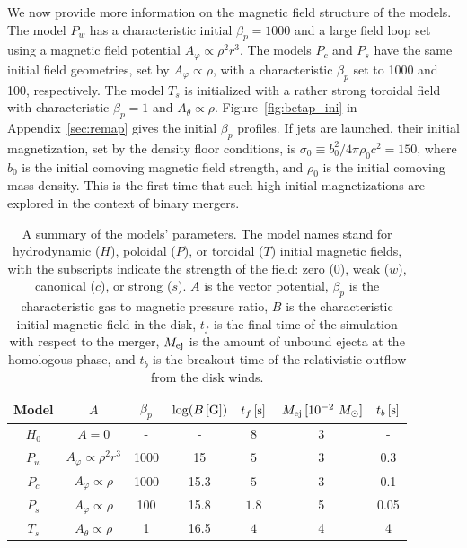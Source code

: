 \documentclass[twocolumn,dvipsnames]{aastex62}
\newcommand{\mej}{\,{M_{\rm ej}}}
\newcommand{\msun}{\,{M_{\odot}}}
\begin{document}
We now provide more information on the magnetic field structure of the models. The model $P_w$ has a characteristic initial $\beta_p = 1000$ and a large field loop set using a magnetic field potential $A_\varphi \propto \rho^2 r^3$. The models $P_c$ and $P_s$ have the same initial field geometries, set by $A_\varphi \propto \rho$, with a characteristic $\beta_p$ set to 1000 and 100, respectively. The model $T_s$ is initialized with a rather strong toroidal field with characteristic $\beta_p = 1$ and $A_\theta \propto \rho$. Figure~\ref{fig:betap_ini} in Appendix~\ref{sec:remap} gives the initial $ \beta_p $ profiles. If jets are launched, their initial magnetization, set by the density floor conditions, is $ \sigma_0 \equiv b_0^2/4\pi\rho_0 c^2 = 150 $, where $ b_0 $ is the initial comoving magnetic field strength, and $ \rho_0 $ is the initial comoving mass density. This is the first time that such high initial magnetizations are explored in the context of binary mergers.

	\begin{table}
		\setlength{\tabcolsep}{2.9pt}
		\centering
		\renewcommand{\arraystretch}{1.2}
		\begin{tabular}{| c | c c c c | c c | }
			
                \hline
			Model & $ A $ & $ \beta_p $ & $ {\rm log}(B\,[{\rm G}]) $ & $ t_f\,[{\rm s}] $ & $ \mej\,[10^{-2}\,\msun] $ & $ t_b\,[{\rm s}] $
			\\	\hline
			$ H_0 $ & $ A = 0 $ & - & - & $ 8 $ & 3 & - \\ %
			$ P_w $ & $ A_\varphi \propto \rho^2r^3 $ & 1000 & 15 & $ 5 $ & 3 & 0.3\\ %
			$ P_c $ & $ A_\varphi \propto \rho $ & 1000 & 15.3 & $ 5 $ & 3 & 0.1 \\   %
			$ P_s $ & $ A_\varphi \propto \rho $ & 100 & 15.8 & $ 1.8 $ & 5 & 0.05\\   %
			$ T_s $ & $ A_\theta \propto \rho $ & 1 & 16.5 & $ 4 $ & 4 & 4 \\ %
                \hline
		\end{tabular}
		
		\caption{
			A summary of the models' parameters. The model names stand for hydrodynamic ($H$), poloidal ($P$), or toroidal ($T$) initial magnetic fields, with the subscripts indicate the strength of the field: zero ($0$), weak ($w$), canonical ($c$), or strong ($s$). $ A $ is the vector potential, $ \beta_p $ is the characteristic gas to magnetic pressure ratio, $ B $ is the characteristic initial magnetic field in the disk, $ t_f $ is the final time of the simulation with respect to the merger, $ M_{\rm ej} $ is the amount of unbound ejecta at the homologous phase, and $ t_b $ is the breakout time of the relativistic outflow from the disk winds.
    		}
    		\label{tab:models}
	\end{table}
\end{document}
